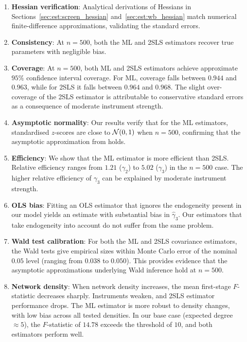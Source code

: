 \begin{enumerate}
    \item \textbf{Hessian verification}: Analytical derivations of Hessians in Sections~\ref{sec:est:screen_hessian} and~\ref{sec:est:wb_hessian} match numerical finite-difference approximations, validating the standard errors.

    \item \textbf{Consistency}: At $n = 500$, both the ML and 2SLS estimators recover true parameters with negligible bias.

    \item \textbf{Coverage}: At $n = 500$, both ML and 2SLS estimators achieve approximate $95\%$ confidence interval coverage. For ML, coverage falls between $0.944$ and $0.963$, while for 2SLS it falls between $0.964$ and $0.968$. The slight over-coverage of the 2SLS estimator is attributable to conservative standard errors as a consequence of moderate instrument strength.

    \item \textbf{Asymptotic normality}: Our results verify that for the ML estimators, standardised $z$-scores are close to $\mathcal{N}(0, 1)$ when $n = 500$, confirming that the asymptotic approximation from \textcite[Thm.~3.2, p.~1906]{Lee2004} holds.

    \item \textbf{Efficiency}: We show that the ML estimator is more efficient than 2SLS\@. Relative efficiency ranges from $1.21$ ($\gamma_2$) to $5.02$ ($\gamma_3$) in the $n = 500$ case. The higher relative efficiency of $\gamma_3$ can be explained by moderate instrument strength.

    \item \textbf{OLS bias}: Fitting an OLS estimator that ignores the endogeneity present in our model yields an estimate with substantial bias in $\hat\gamma_3$. Our estimators that take endogeneity into account do not suffer from the same problem.

    \item \textbf{Wald test calibration}: For both the ML and 2SLS covariance estimators, the Wald tests give empirical sizes within Monte Carlo error of the nominal $0.05$ level (ranging from $0.038$ to $0.050$). This provides evidence that the asymptotic approximations underlying Wald inference hold at $n = 500$.

    \item \textbf{Network density}: When network density increases, the mean first-stage $F$-statistic decreases sharply. Instruments weaken, and 2SLS estimator performance drops. The ML estimator is more robust to density changes, with low bias across all tested densities. In our base case (expected degree $\approx 5$), the $F$-statistic of $14.78$ exceeds the threshold of $10$, and both estimators perform well.


\end{enumerate}

